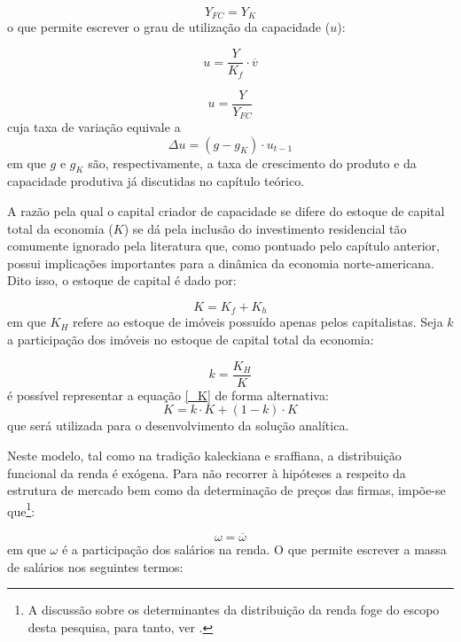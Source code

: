 \begin{equation}
\label{_YFC}
    Y_{FC} = Y_K
\end{equation}
o que permite escrever o grau de utilização da capacidade ($u$):

$$
u = \frac{Y}{K_f}\cdot \overline v
$$

\begin{equation}
\label{_u}
    u = \frac{Y}{Y_{FC}}
\end{equation}
cuja taxa de variação equivale a
\begin{equation}
\label{Aux}
\Delta u = (g - g_K)\cdot u_{t-1}
\end{equation}
em que $g$ e $g_K$ são, respectivamente, a taxa de crescimento do produto e da capacidade produtiva já discutidas no capítulo teórico.

A razão pela qual o capital criador de capacidade se difere do estoque de capital total da economia ($K$) se dá pela inclusão do investimento residencial tão comumente ignorado pela literatura que, como pontuado pelo capítulo anterior, possui implicações importantes para a dinâmica da economia norte-americana. Dito isso, o estoque de capital é dado por:

\begin{equation}
\label{_K}
    K = K_f + K_h
\end{equation}
em que $K_H$ refere ao estoque de imóveis possuído apenas pelos capitalistas. Seja $k$ a participação dos imóveis no estoque de capital total da economia:

\begin{equation}
\label{_tau}
k = \frac{K_H}{K}    
\end{equation}
é possível representar a equação \ref{_K} de forma alternativa:
$$
K = k\cdot K + (1-k)\cdot K
$$
que será utilizada para o desenvolvimento da solução analítica.

Neste modelo, tal como na tradição kaleckiana e sraffiana, a distribuição funcional da renda é exógena. Para não recorrer à hipóteses a respeito da estrutura de mercado bem como da determinação de preços das firmas, impõe-se que\footnote{A discussão sobre os determinantes da distribuição da renda foge do escopo desta pesquisa, para tanto, ver \textcite{pivetti_essay_1992}. }:

\begin{equation}
    \omega = \overline{\omega}
\end{equation}
em que $\omega$ é a participação dos salários na renda. O que permite escrever a massa de salários nos seguintes termos:

